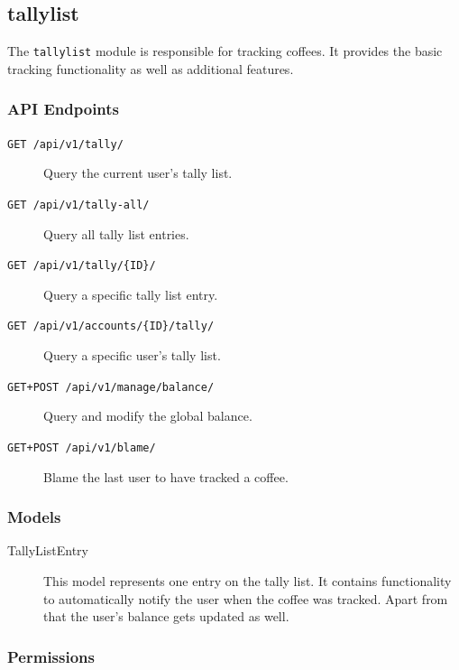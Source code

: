 \subsection{tallylist}\label{tallylist}

The \texttt{tallylist} module is responsible for tracking coffees. It
provides the basic tracking functionality as well as additional
features.

\subsubsection{API Endpoints}\label{api-endpoints-3}

\begin{description}
\item[\texttt{GET\ /api/v1/tally/}] Query the current user's tally list.

\item[\texttt{GET\ /api/v1/tally-all/}] Query all tally list entries.

\item[\texttt{GET\ /api/v1/tally/\{ID\}/}] Query a specific tally list entry.

\item[\texttt{GET\ /api/v1/accounts/\{ID\}/tally/}] Query a specific user's
tally list.

\item[\texttt{GET+POST\ /api/v1/manage/balance/}] Query and modify the global
balance.

\item[\texttt{GET+POST\ /api/v1/blame/}] Blame the last user to have tracked a
coffee.
\end{description}

\subsubsection{Models}\label{models-4}

\begin{description}
\item[TallyListEntry] This model represents one entry on the tally
list. It contains functionality to automatically notify the user when
the coffee was tracked. Apart from that the user's balance gets updated
as well.
\end{description}

\subsubsection{Permissions}\label{permissions-2}

